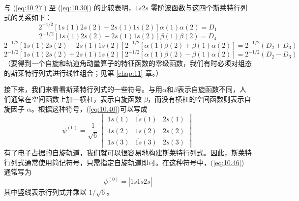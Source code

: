     与 (\ref{eq:10.27}) 至 (\ref{eq:10.30}) 的比较表明，$1s2s$ 零阶波函数与这四个斯莱特行列式的关系如下：
    \begin{equation}
        2^{-1/2} \left[1s\left(1\right)2s\left(2\right) - 2s\left(1\right)1s\left(2\right)\right]\alpha\left(1\right)\alpha\left(2\right) = D_1
        \label{eq:10.42}
    \end{equation}
    \begin{equation}
        2^{-1/2} \left[1s\left(1\right)2s\left(2\right) - 2s\left(1\right)1s\left(2\right)\right]\beta\left(1\right)\beta\left(2\right) = D_4
        \label{eq:10.43}
    \end{equation}
    \begin{equation}
        2^{-1/2} \left[1s\left(1\right)2s\left(2\right) - 2s\left(1\right)1s\left(2\right)\right]2^{-1/2} \left[\alpha\left(1\right)\beta\left(2\right) + \beta\left(1\right)\alpha\left(2\right)\right] = 2^{-1/2} \left(D_2 + D_3\right)
        \label{eq:10.44}
    \end{equation}
    \begin{equation}
        2^{-1/2} \left[1s\left(1\right)2s\left(2\right) + 2s\left(1\right)1s\left(2\right)\right]2^{-1/2} \left[\alpha\left(1\right)\beta\left(2\right) - \beta\left(1\right)\alpha\left(2\right)\right] = 2^{-1/2} \left(D_2 - D_3\right)
        \label{eq:10.45}
    \end{equation}
    （要得到一个自旋和轨道角动量算子的特征函数的零级函数，我们有时必须对组态的斯莱特行列式进行线性组合；见第 \ref{chap:11} 章。）

    接下来，我们来看看斯莱特行列式的一些符号。与用$\alpha$和$\beta$表示自旋函数不同，人们通常在空间函数上加一横杠，表示自旋函数 $\beta$，而没有横杠的空间函数则表示自旋因子 $\alpha$。根据这种符号，(\ref{eq:10.40})可以写成
    \begin{equation}
        \psi^{\left(0\right)} = \frac{1}{\sqrt{6}}\begin{vmatrix}
            1s\left(1\right) & \overline{1s}\left(1\right) & 2s\left(1\right) \\
            1s\left(2\right) & \overline{1s}\left(2\right) & 2s\left(2\right) \\
            1s\left(3\right) & \overline{1s}\left(3\right) & 2s\left(3\right)
        \end{vmatrix}
        \label{eq:10.46}
    \end{equation}
    有了电子占据的自旋轨道，我们就可以很容易地构建斯莱特行列式。因此，斯莱特行列式通常使用简记符号，只需指定自旋轨道即可。在这种符号中，(\ref{eq:10.46}) 通常写为
    \begin{equation}
        \boxed{
            \psi^{\left(0\right)} = \left|1s \overline{1s}2s\right|
        }
        \label{eq:10.47}
    \end{equation}
    其中竖线表示行列式并乘以 $1/\sqrt{6}$。

